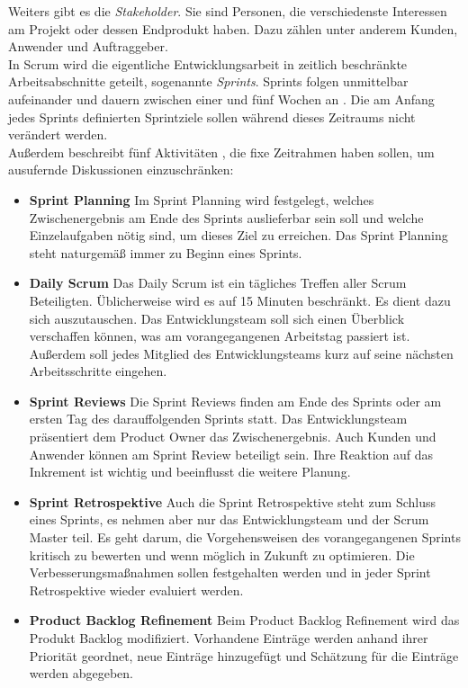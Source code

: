 Weiters gibt es die \textit{Stakeholder}. Sie sind Personen, die verschiedenste Interessen am Projekt oder dessen Endprodukt haben. Dazu zählen unter anderem Kunden, Anwender und Auftraggeber.\\
In Scrum wird die eigentliche Entwicklungsarbeit in zeitlich beschränkte Arbeitsabschnitte geteilt, sogenannte \textit{Sprints}. Sprints folgen unmittelbar aufeinander und dauern zwischen einer und fünf Wochen an \cite{linz_testing_2014}. Die am Anfang jedes Sprints definierten Sprintziele sollen während dieses Zeitraums nicht verändert werden.\\
Außerdem beschreibt \citeauthor{linz_testing_2014} fünf Aktivitäten \cite{linz_testing_2014}, die fixe Zeitrahmen haben sollen, um ausufernde Diskussionen einzuschränken:
\begin{itemize}
\item \textbf{Sprint Planning} Im Sprint Planning wird festgelegt, welches Zwischenergebnis am Ende des Sprints auslieferbar sein soll und welche Einzelaufgaben nötig sind, um dieses Ziel zu erreichen. Das Sprint Planning steht naturgemäß immer zu Beginn eines Sprints.
\item \textbf{Daily Scrum} Das Daily Scrum ist ein tägliches Treffen aller Scrum Beteiligten. Üblicherweise wird es auf 15 Minuten beschränkt. Es dient dazu sich auszutauschen. Das Entwicklungsteam soll sich einen Überblick verschaffen können, was am vorangegangenen Arbeitstag passiert ist. Außerdem soll jedes Mitglied des Entwicklungsteams kurz auf seine nächsten Arbeitsschritte eingehen.
\item \textbf{Sprint Reviews} Die Sprint Reviews finden am Ende des Sprints oder am ersten Tag des darauffolgenden Sprints statt. Das Entwicklungsteam präsentiert dem Product Owner das Zwischenergebnis. Auch Kunden und Anwender können am Sprint Review beteiligt sein. Ihre Reaktion auf das Inkrement ist wichtig und beeinflusst die weitere Planung.
\item \textbf{Sprint Retrospektive} Auch die Sprint Retrospektive steht zum Schluss eines Sprints, es nehmen aber nur das Entwicklungsteam und der Scrum Master teil. Es geht darum, die Vorgehensweisen des vorangegangenen Sprints kritisch zu bewerten und wenn möglich in Zukunft zu optimieren. Die Verbesserungsmaßnahmen sollen festgehalten werden und in jeder Sprint Retrospektive wieder evaluiert werden.
\item \textbf{Product Backlog Refinement} Beim Product Backlog Refinement wird das Produkt Backlog modifiziert. Vorhandene Einträge werden anhand ihrer Priorität geordnet, neue Einträge hinzugefügt und Schätzung für die Einträge werden abgegeben.
\end{itemize}

